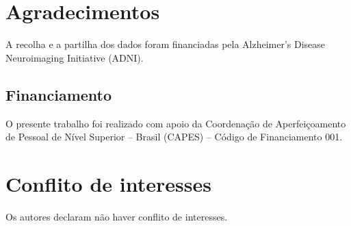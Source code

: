 \documentclass[review]{elsarticle}
\begin{document}
	\section*{Agradecimentos}
	
	A recolha e a partilha dos dados foram financiadas pela Alzheimer's Disease Neuroimaging Initiative (ADNI).
	
	\subsection*{Financiamento}
	
	O presente trabalho foi realizado com apoio da Coordenação de Aperfeiçoamento de Pessoal de Nível Superior -- Brasil (CAPES) -- Código de Financiamento 001.
	
	\section*{Conflito de interesses}
	
	Os autores declaram não haver conflito de interesses.
	
	
	
\end{document}

